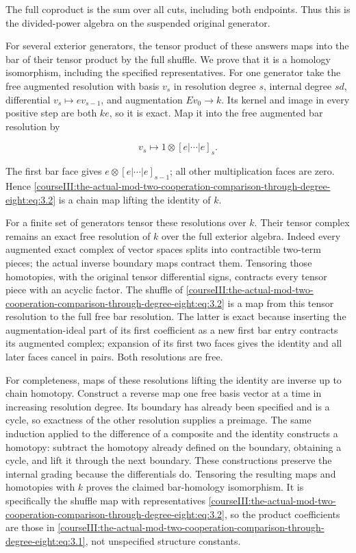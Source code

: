 The full coproduct is the sum over all cuts, including both endpoints. Thus this is the divided-power algebra on the suspended original generator.

For several exterior generators, the tensor product of these answers maps into the bar of their tensor product by the full shuffle. We prove that it is a homology isomorphism, including the specified representatives. For one generator take the free augmented resolution with basis \(v_s\) in resolution degree \(s\), internal degree \(sd\), differential \(v_s\mapsto ev_{s-1}\), and augmentation \(Ev_0\to k\). Its kernel and image in every positive step are both \(ke\), so it is exact. Map it into the free augmented bar resolution by

\begin{equation}
v_s\longmapsto 1\otimes[e|\cdots|e]_s.
\label{courseIII:the-actual-mod-two-cooperation-comparison-through-degree-eight:eq:3.2}
\end{equation}

The first bar face gives \(e\otimes[e|\cdots|e]_{s-1}\); all other multiplication faces are zero. Hence \eqref{courseIII:the-actual-mod-two-cooperation-comparison-through-degree-eight:eq:3.2} is a chain map lifting the identity of \(k\).

For a finite set of generators tensor these resolutions over \(k\). Their tensor complex remains an exact free resolution of \(k\) over the full exterior algebra. Indeed every augmented exact complex of vector spaces splits into contractible two-term pieces; the actual inverse boundary maps contract them. Tensoring those homotopies, with the original tensor differential signs, contracts every tensor piece with an acyclic factor. The shuffle of \eqref{courseIII:the-actual-mod-two-cooperation-comparison-through-degree-eight:eq:3.2} is a map from this tensor resolution to the full free bar resolution. The latter is exact because inserting the augmentation-ideal part of its first coefficient as a new first bar entry contracts its augmented complex; expansion of its first two faces gives the identity and all later faces cancel in pairs. Both resolutions are free.

For completeness, maps of these resolutions lifting the identity are inverse up to chain homotopy. Construct a reverse map one free basis vector at a time in increasing resolution degree. Its boundary has already been specified and is a cycle, so exactness of the other resolution supplies a preimage. The same induction applied to the difference of a composite and the identity constructs a homotopy: subtract the homotopy already defined on the boundary, obtaining a cycle, and lift it through the next boundary. These constructions preserve the internal grading because the differentials do. Tensoring the resulting maps and homotopies with \(k\) proves the claimed bar-homology isomorphism. It is specifically the shuffle map with representatives \eqref{courseIII:the-actual-mod-two-cooperation-comparison-through-degree-eight:eq:3.2}, so the product coefficients are those in \eqref{courseIII:the-actual-mod-two-cooperation-comparison-through-degree-eight:eq:3.1}, not unspecified structure constants.

